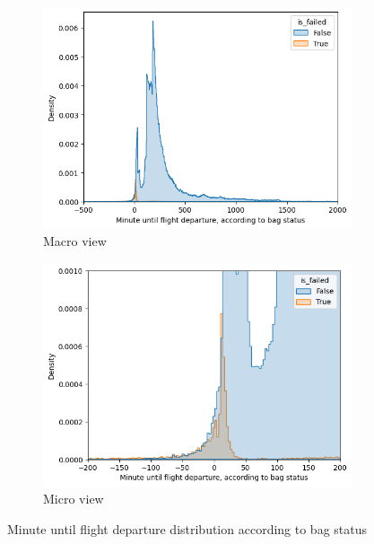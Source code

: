 \documentclass[12pt]{article}
\begin{document}
\FloatBarrier
\begin{figure}[ht]
  \centering
  \begin{subfigure}{0.48\textwidth}
    \includegraphics[width=\linewidth]{Minute until flight departure_2.png}
    \caption{Macro view}
  \end{subfigure}
  \hfill
  \begin{subfigure}{0.48\textwidth}
    \includegraphics[width=\linewidth]{Minute until flight departure_3.png}
    \caption{Micro view}
  \end{subfigure}
  \caption{Minute until flight departure distribution according to bag status}
  \label{fig:Minute until flight departure distribution according to bag status}
\end{figure}
\end{document}
